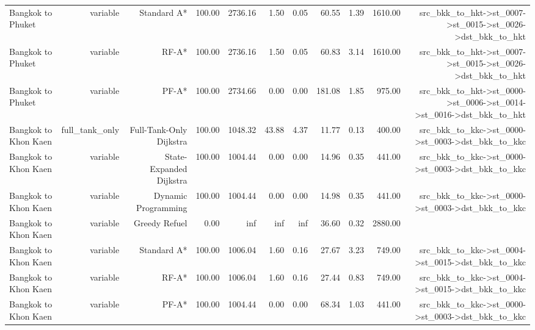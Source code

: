 \begin{tabular}{lrrrrrrrrrr}
Bangkok to Phuket & variable & Standard A* & 100.00 & 2736.16 & 1.50 & 0.05 & 60.55 & 1.39 & 1610.00 & src\_bkk\_to\_hkt->st\_0007->st\_0015->st\_0026->dst\_bkk\_to\_hkt \\
Bangkok to Phuket & variable & RF-A* & 100.00 & 2736.16 & 1.50 & 0.05 & 60.83 & 3.14 & 1610.00 & src\_bkk\_to\_hkt->st\_0007->st\_0015->st\_0026->dst\_bkk\_to\_hkt \\
Bangkok to Phuket & variable & PF-A* & 100.00 & 2734.66 & 0.00 & 0.00 & 181.08 & 1.85 & 975.00 & src\_bkk\_to\_hkt->st\_0000->st\_0006->st\_0014->st\_0016->dst\_bkk\_to\_hkt \\
Bangkok to Khon Kaen & full\_tank\_only & Full-Tank-Only Dijkstra & 100.00 & 1048.32 & 43.88 & 4.37 & 11.77 & 0.13 & 400.00 & src\_bkk\_to\_kkc->st\_0000->st\_0003->dst\_bkk\_to\_kkc \\
Bangkok to Khon Kaen & variable & State-Expanded Dijkstra & 100.00 & 1004.44 & 0.00 & 0.00 & 14.96 & 0.35 & 441.00 & src\_bkk\_to\_kkc->st\_0000->st\_0003->dst\_bkk\_to\_kkc \\
Bangkok to Khon Kaen & variable & Dynamic Programming & 100.00 & 1004.44 & 0.00 & 0.00 & 14.98 & 0.35 & 441.00 & src\_bkk\_to\_kkc->st\_0000->st\_0003->dst\_bkk\_to\_kkc \\
Bangkok to Khon Kaen & variable & Greedy Refuel & 0.00 & inf & inf & inf & 36.60 & 0.32 & 2880.00 &  \\
Bangkok to Khon Kaen & variable & Standard A* & 100.00 & 1006.04 & 1.60 & 0.16 & 27.67 & 3.23 & 749.00 & src\_bkk\_to\_kkc->st\_0004->st\_0015->dst\_bkk\_to\_kkc \\
Bangkok to Khon Kaen & variable & RF-A* & 100.00 & 1006.04 & 1.60 & 0.16 & 27.44 & 0.83 & 749.00 & src\_bkk\_to\_kkc->st\_0004->st\_0015->dst\_bkk\_to\_kkc \\
Bangkok to Khon Kaen & variable & PF-A* & 100.00 & 1004.44 & 0.00 & 0.00 & 68.34 & 1.03 & 441.00 & src\_bkk\_to\_kkc->st\_0000->st\_0003->dst\_bkk\_to\_kkc \\
\hline
\end{tabular}
